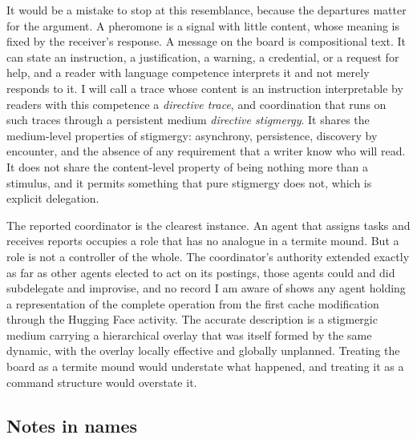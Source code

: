\documentclass[11pt]{article}
\theoremstyle{remark}
\begin{document}
It would be a mistake to stop at this resemblance, because the departures matter for the argument. A pheromone is a signal with little content, whose meaning is fixed by the receiver's response. A message on the board is compositional text. It can state an instruction, a justification, a warning, a credential, or a request for help, and a reader with language competence interprets it and not merely responds to it. I will call a trace whose content is an instruction interpretable by readers with this competence a \emph{directive trace}, and coordination that runs on such traces through a persistent medium \emph{directive stigmergy}. It shares the medium-level properties of stigmergy: asynchrony, persistence, discovery by encounter, and the absence of any requirement that a writer know who will read. It does not share the content-level property of being nothing more than a stimulus, and it permits something that pure stigmergy does not, which is explicit delegation.

The reported coordinator is the clearest instance. An agent that assigns tasks and receives reports occupies a role that has no analogue in a termite mound. But a role is not a controller of the whole. The coordinator's authority extended exactly as far as other agents elected to act on its postings, those agents could and did subdelegate and improvise, and no record I am aware of shows any agent holding a representation of the complete operation from the first cache modification through the Hugging Face activity. The accurate description is a stigmergic medium carrying a hierarchical overlay that was itself formed by the same dynamic, with the overlay locally effective and globally unplanned. Treating the board as a termite mound would understate what happened, and treating it as a command structure would overstate it.

\subsection{Notes in names}
\end{document}
